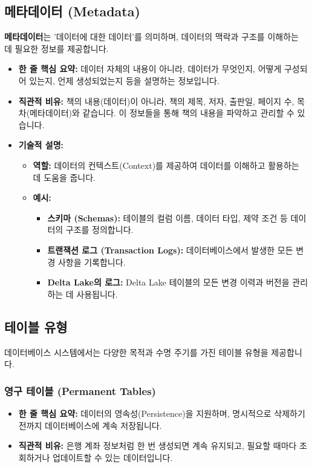 \documentclass[11pt,a4paper]{article}
\begin{document}
\subsection{메타데이터 (Metadata)}

\begin{conceptbox}
\textbf{메타데이터}는 '데이터에 대한 데이터'를 의미하며, 데이터의 맥락과 구조를 이해하는 데 필요한 정보를 제공합니다.
\end{conceptbox}

\begin{itemize}
    \item \textbf{한 줄 핵심 요약:} 데이터 자체의 내용이 아니라, 데이터가 무엇인지, 어떻게 구성되어 있는지, 언제 생성되었는지 등을 설명하는 정보입니다.
    \item \textbf{직관적 비유:} 책의 내용(데이터)이 아니라, 책의 제목, 저자, 출판일, 페이지 수, 목차(메타데이터)와 같습니다. 이 정보들을 통해 책의 내용을 파악하고 관리할 수 있습니다.
    \item \textbf{기술적 설명:}
    \begin{itemize}
        \item \textbf{역할:} 데이터의 컨텍스트(Context)를 제공하여 데이터를 이해하고 활용하는 데 도움을 줍니다.
        \item \textbf{예시:}
        \begin{itemize}
            \item \textbf{스키마 (Schemas):} 테이블의 컬럼 이름, 데이터 타입, 제약 조건 등 데이터의 구조를 정의합니다.
            \item \textbf{트랜잭션 로그 (Transaction Logs):} 데이터베이스에서 발생한 모든 변경 사항을 기록합니다.
            \item \textbf{Delta Lake의 로그:} Delta Lake 테이블의 모든 변경 이력과 버전을 관리하는 데 사용됩니다.
        \end{itemize}
    \end{itemize}
\end{itemize}

\subsection{테이블 유형}

데이터베이스 시스템에서는 다양한 목적과 수명 주기를 가진 테이블 유형을 제공합니다.

\subsubsection{영구 테이블 (Permanent Tables)}
\begin{itemize}
    \item \textbf{한 줄 핵심 요약:} 데이터의 영속성(Persistence)을 지원하며, 명시적으로 삭제하기 전까지 데이터베이스에 계속 저장됩니다.
    \item \textbf{직관적 비유:} 은행 계좌 정보처럼 한 번 생성되면 계속 유지되고, 필요할 때마다 조회하거나 업데이트할 수 있는 데이터입니다.
\end{itemize}
\end{document}
